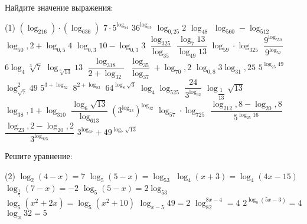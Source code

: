 %
%

\begin{class}[number=1]
	\begin{listofex}
		\item Найдите значение выражения:
		\begin{tasks}(1)
			\task \( (\log_216)\cdot(\log_636) \)
			\task \( 7\cdot5^{\log_54} \)
			\task \( 36^{\log_65} \)
			\task \( \log_{0,25}2 \)
			\task \( \log_48 \)
			\task \( \log_560-\log_512 \)
			\task \( \log_50,2+\log_{0,5}4 \)
			\task \( \log_{0,3}10-\log_{0,3}3 \)
			\task \( \dfrac{\log_325}{\log_35} \)
			\task \( \dfrac{\log_{7}13}{\log_{49}13} \)
			\task \( \log_59\cdot\log_325 \)
			\task \( \dfrac{9^{\log_550}}{9^{\log_52}} \)
			\task \( 6\log_4\sqrt[3]{7} \)
			\task \( \log_{\sqrt[6]{13}}13 \)
			\task \( \dfrac{\log_318}{2+\log_32} \)
			\task \( \dfrac{\log_35}{\log_37}+\log_70,2 \)
			\task \( \log_{0,8}3\log_31,25 \)
			\task \( 5^{\log_{25}49} \)
			\task \( \log^2_{\sqrt{7}}49 \)
			\task \( 5^{3+\log_52} \)
			\task \( 8^{2+\log_83} \)
			\task \( 64^{\log_8\sqrt{3}} \)
			\task \( \log_4\log_525 \)
			\task \( \dfrac{24}{3^{\log_32}} \)
			\task \( \log_{\dfrac{1}{13}}\sqrt{13} \)
			\task \( \log_38,1+\log_310 \)
			\task \( \dfrac{\log_6\sqrt{13}}{\log_613} \)
			\task \( \left( 3^{\log_23} \right)^{\log_32}\)
			\task \( \log_57\cdot\log_725 \)
			\task \( \dfrac{\log_212,8-\log_20,8}{5^{\log_{25}16}} \)
			\task \( \dfrac{\log_23,2-\log_20,2}{3^{\log_925}} \)
			\task \( 3^{\log_37}+49^{\log_7{\sqrt{13}}} \)
		\end{tasks}	
		\item \mexercise{_78}
		\item Решите уравнение:
		\begin{tasks}(2)
			\task \( \log_2(4-x)=7 \)
			\task \( \log_5(5-x)=\log_53 \)
			\task \( \log_4(x+3)=\log_4(4x-15) \)
			\task \( \log_{\frac{1}{7}}(7-x)=-2 \)
			\task \( \log_5(5-x)=2\log_53 \)
			\task \( \log_5(x^2+2x)=\log_5(x^2+10) \)
			\task \( \log_{x-5}49=2 \)
			\task \( \log_82^{8x-4}=4 \)
			\task \( 2^{\log_8(5x-3)}=4 \)
			\task \( \log_x32=5 \)
		\end{tasks}
	\end{listofex}
\end{class}

